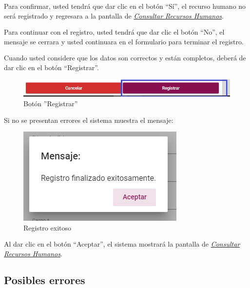             Para confirmar, usted tendrá que dar clic en el botón “Sí”, el recurso humano no será registrado y regresara a la pantalla de \hyperlink{consultarRH}{\textit{Consultar Recursos Humanos}}.
            
            Para continuar con el registro, usted tendrá que  dar clic el botón “No”, el mensaje se cerrara y usted continuara en el formulario para terminar el registro.
            
            Cuando usted considere que los datos son correctos y están completos, deberá de dar clic en el botón “Registrar”.
            
            \begin{figure}[!hbtp]
                \centering
                \hypertarget{btnreg}{\includegraphics[width=0.7\linewidth]{images/SP1/BtnRegistrar}}
                \caption{Botón ''Registrar''}
                \label{btnreg}
            \end{figure}
            
            Si no se presentan errores el sistema muestra el mensaje:
            
                 
             \begin{figure}[!hbtp]
                \centering
            \includegraphics[width=0.4\linewidth]{images/SP1/MSG5}
                \caption{Registro exitoso}
                \label{mensaje5}
                
            \end{figure}
        
            Al dar clic en el botón “Aceptar”, el sistema mostrará la pantalla de  \hyperlink{consultarRH}{\textit{Consultar Recursos Humanos}}.
    
            \subsection{Posibles errores} 
        
